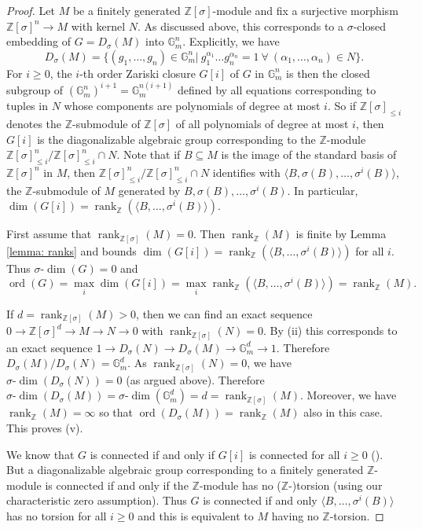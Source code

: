 \documentclass[oneside,reqno]{amsart}
\theoremstyle{definition}
\newcommand{\sdim}{\sigma\text{-}\dim}
\newcommand{\ord}{\operatorname{ord}}
\newcommand{\s}{\sigma}
\newcommand{\Gm}{\mathbb{G}_m}
\newcommand{\ZZ}{\mathbb{Z}}
\newcommand{\rank}{\operatorname{rank}}
\begin{document}
\begin{proof}
	Let $M$ be a finitely generated $\ZZ[\s]$-module and fix a surjective morphism $\ZZ[\s]^n\to M$ with kernel $N$. As discussed above, this corresponds to a $\s$-closed embedding of $G=D_\s(M)$ into $\Gm^n$. Explicitly, we have $$D_\s(M)=\{(g_1,\ldots,g_n)\in\Gm^n|\ g_1^{\alpha_1}\ldots g_n^{\alpha_n}=1 \ \forall \ (\alpha_1,\ldots,\alpha_n)\in N\}. $$ 
	For $i\geq 0$, the $i$-th order Zariski closure $G[i]$ of $G$ in $\Gm^n$ is then the closed subgroup of $(\Gm^n)^{i+1}=\Gm^{n(i+1)}$ defined by all equations corresponding to tuples in $N$ whose components are polynomials of degree at most $i$. So if $\ZZ[\s]_{\leq i}$ denotes the $\ZZ$-submodule of $\ZZ[\s]$ of all polynomials of degree at most $i$, then $G[i]$ is the diagonalizable algebraic group corresponding to the $\ZZ$-module $\ZZ[\s]_{\leq i}^n/\ZZ[\s]_{\leq i}^n\cap N$. Note that if $B\subseteq M$ is the image of the standard basis of $\ZZ[\s]^n$ in $M$, then $\ZZ[\s]_{\leq i}^n/\ZZ[\s]_{\leq i}^n\cap N$ identifies with $\langle B,\s(B),\ldots,\s^i(B)\rangle$, the $\ZZ$-submodule of $M$ generated by $B,\s(B),\ldots,\s^i(B)$. In particular, $\dim(G[i])=\rank_{\ZZ}(\langle B,\ldots,\s^i(B)\rangle)$.
	
	First assume that $\rank_{\ZZ[\s]}(M)=0$. Then $\rank_\ZZ(M)$ is finite by Lemma \ref{lemma: ranks} and bounds $\dim(G[i])=\rank_{\ZZ}(\langle B,\ldots,\s^i(B)\rangle)$ for all $i$. Thus $\sdim(G)=0$ and $$\ord(G)=\max_i\dim(G[i])=\max_i\rank_{\ZZ}(\langle B,\ldots,\s^i(B)\rangle)=\rank_\ZZ(M).$$
	
	If $d=\rank_{\ZZ[\s]}(M)>0$, then we can find an exact sequence $0\to \ZZ[\s]^d\to M\to N\to 0$ with $\rank_{\ZZ[\s]}(N)=0$. By (ii) this corresponds to an exact sequence $1\to D_\s(N)\to D_\s(M)\to \Gm^d\to 1$. Therefore $D_\s(M)/D_\s(N)=\Gm^d$. As $\rank_{\ZZ[\s]}(N)=0$, we have $\sdim(D_\s(N))=0$ (as argued above). Therefore $\sdim(D_\s(M))=\sdim(\Gm^d)=d=\rank_{\ZZ[\s]}(M)$. Moreover, we have $\rank_\ZZ(M)=\infty$ so that $\ord(D_\s(M))=\rank_\ZZ(M)$ also in this case. This proves (v).
	
	We know that $G$ is connected if and only if $G[i]$ is connected for all $i\geq 0$ (\cite[Lemma~6.12]{Wibmer:almostsimple}). But a diagonalizable algebraic group corresponding to a finitely generated $\ZZ$-module is connected if and only if the $\ZZ$-module has no ($\ZZ$-)torsion (using our characteristic zero assumption). Thus $G$ is connected if and only $\langle B,\ldots,\s^i(B)\rangle$ has no torsion for all $i\geq 0$ and this is equivalent to $M$ having no $\ZZ$-torsion.
\end{proof}	
\end{document}
